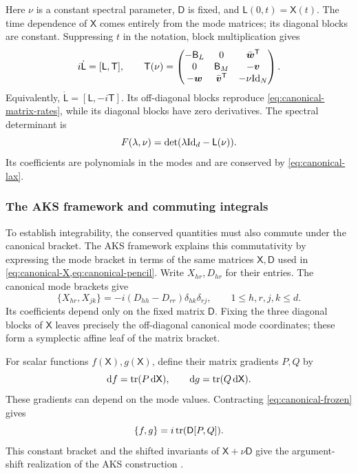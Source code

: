 Here $\nu$ is a constant spectral parameter, $\mathsf D$ is fixed,
and $\mathsf L(0,t)=\mathsf X(t)$. The time dependence of
$\mathsf X$ comes entirely from the mode matrices; its diagonal
blocks are constant. Suppressing $t$ in the notation, block
multiplication gives
\begin{equation}\label{eq:canonical-lax}
 i\dot{\mathsf L}=[\mathsf L,\mathsf T],\qquad
 \mathsf T(\nu)=\begin{pmatrix}
 -\mathsf B_L&0&\bar{\boldsymbol w}^{\mathsf T}\\
 0&\mathsf B_M&-\boldsymbol v\\
 -\boldsymbol w&\bar{\boldsymbol v}^{\mathsf T}&-\nu\mathrm{Id}_N
 \end{pmatrix}.
\end{equation}
Equivalently, $\dot{\mathsf L}=[\mathsf L,-i\mathsf T]$. Its off-diagonal blocks reproduce \cref{eq:canonical-matrix-rates},
while its diagonal blocks have zero derivatives.
The spectral determinant is
\begin{equation}\label{eq:canonical-spectral}
 F(\lambda,\nu)=\det(\lambda\mathrm{Id}_d-\mathsf L(\nu)).
\end{equation}
Its coefficients are polynomials in the modes and are conserved by
\cref{eq:canonical-lax}.

\subsubsection{The AKS framework and commuting integrals}
\label{sec:canonical-AKS}

To establish integrability, the conserved quantities must also commute
under the canonical bracket. The AKS framework explains this
commutativity by expressing the mode bracket in terms of the same
matrices $\mathsf X,\mathsf D$ used in
\cref{eq:canonical-X,eq:canonical-pencil}.
Write $X_{hr},D_{hr}$ for their entries. The canonical mode brackets give
\begin{equation}\label{eq:canonical-frozen}
 \{X_{hr},X_{jk}\}
 =-i(D_{hh}-D_{rr})\delta_{hk}\delta_{rj},
 \qquad1\leq h,r,j,k\leq d.
\end{equation}
Its coefficients depend only on the fixed matrix $\mathsf D$.
Fixing the three diagonal blocks of $\mathsf X$ leaves precisely the
off-diagonal canonical mode coordinates; these form a symplectic
affine leaf of the matrix bracket.

For scalar functions $f(\mathsf X),g(\mathsf X)$, define their
matrix gradients $P,Q$ by
\begin{equation}\label{eq:canonical-matrix-gradients}
 \mathrm df=\operatorname{tr}(P\,\mathrm d\mathsf X),\qquad
 \mathrm dg=\operatorname{tr}(Q\,\mathrm d\mathsf X).
\end{equation}
These gradients can depend on the mode values. Contracting
\cref{eq:canonical-frozen} gives
\begin{equation}\label{eq:canonical-gradient-bracket}
 \{f,g\}
 =i\operatorname{tr}(\mathsf D[P,Q]).
\end{equation}
This constant bracket and the shifted invariants of
$\mathsf X+\nu\mathsf D$ give the argument-shift realization of
the AKS construction \cite{MishchenkoFomenko1978,Bolsinov1992,
AdlerVanMoerbeke2018}.

